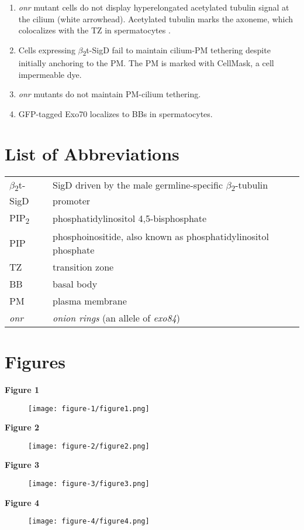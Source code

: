 \documentclass[12pt, twoside, letterpaper]{article}
\newcommand{\PIP}{PIP\textsubscript{2}}
\newcommand{\sigd}{$\beta$\textsubscript{2}t-SigD}
\begin{document}
\begin{doublespacing}
\begin{linenumbers}
    \begin{enumerate}[label={(\Alph*)}, nolistsep]
    \item \textit{onr} mutant cells do not display hyperelongated acetylated tubulin signal at the cilium (white arrowhead).
      Acetylated tubulin marks the axoneme, which colocalizes with the TZ in spermatocytes \citep{pratt2016drosophila}.
    \item Cells expressing \sigd{} fail to maintain cilium-PM tethering despite initially anchoring to the PM.
      The PM is marked with CellMask, a cell impermeable dye.
    \item \textit{onr} mutants do not maintain PM-cilium tethering.
    \item GFP-tagged Exo70 localizes to BBs in spermatocytes.
    \end{enumerate}
    
  \end{linenumbers}


    \section*{List of Abbreviations}
    \begin{tabular}{ll}
       \sigd{} & SigD driven by the male germline-specific $\beta$\textsubscript{2}-tubulin promoter \\
       \PIP{} & phosphatidylinositol 4,5-bisphosphate \\
      PIP & phosphoinositide, also known as phosphatidylinositol phosphate \\
       TZ & transition zone \\
       BB & basal body \\
       PM & plasma membrane \\ 
       \textit{onr} & \textit{onion rings} (an allele of \textit{exo84})
    \end{tabular}
\end{doublespacing}



\newpage

\section*{Figures}

\textbf{Figure 1}
\begin{figure}[ht]
  \texttt{[image: figure-1/figure1.png]}
\end{figure}
\newpage

\textbf{Figure 2}
\begin{figure}[ht]
  \texttt{[image: figure-2/figure2.png]}
\end{figure}
\newpage

\textbf{Figure 3}
\begin{figure}[ht]
  \texttt{[image: figure-3/figure3.png]}
\end{figure}
\newpage

\textbf{Figure 4}
\begin{figure}[ht]
  \texttt{[image: figure-4/figure4.png]}
\end{figure}
\newpage
\end{document}

